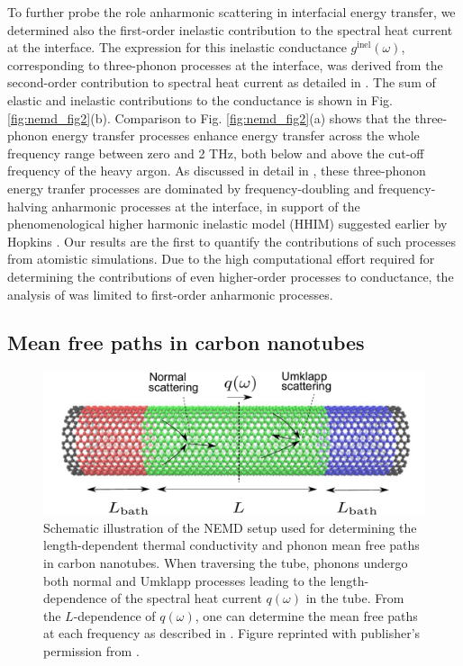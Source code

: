 To further probe the role anharmonic scattering in interfacial energy transfer, we determined also the first-order inelastic contribution to the spectral heat current at the interface. The expression for this inelastic conductance $g^{\textrm{inel}}(\omega)$, corresponding to three-phonon processes at the interface, was derived from the second-order contribution to spectral heat current as detailed in . The sum of elastic and inelastic contributions to the conductance is shown in Fig. \ref{fig:nemd_fig2}(b). Comparison to Fig. \ref{fig:nemd_fig2}(a) shows that the three-phonon energy transfer processes enhance energy transfer across the whole frequency range between zero and 2 THz, both below and above the cut-off frequency of the heavy argon. As discussed in detail in , these three-phonon energy tranfer processes are dominated by frequency-doubling and frequency-halving anharmonic processes at the interface, in support of the phenomenological higher harmonic inelastic model (HHIM) suggested earlier by Hopkins \cite{hopkins09_jap}. Our results are the first to quantify the contributions of such processes from atomistic simulations. Due to the high computational effort required for determining the contributions of even higher-order processes to conductance, the analysis of  was limited to first-order anharmonic processes.

\subsection{Mean free paths in carbon nanotubes}

\label{sec:results_mfps}

\begin{figure}[tb]
 \begin{center}
  \includegraphics[width=.89\columnwidth]{pics/cnt_fig1-crop.pdf} 
  \caption{Schematic illustration of the NEMD setup used for determining the length-dependent thermal conductivity and phonon mean free paths in carbon nanotubes. When traversing the tube, phonons undergo both normal and Umklapp processes leading to the length-dependence of the spectral heat current $q(\omega)$ in the tube. From the $L$-dependence of $q(\omega)$, one can determine the mean free paths at each frequency as described in . Figure reprinted with publisher's permission from .}  
\label{fig:cnt_fig1}
 \end{center}
\end{figure}

